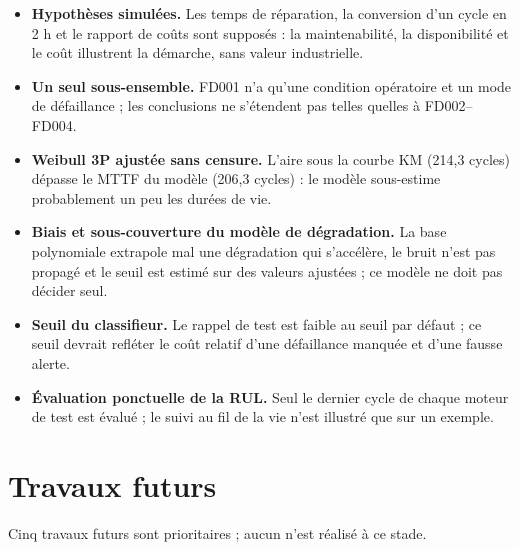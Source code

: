 \begin{itemize}
\item \textbf{Hypothèses simulées.} Les temps de réparation, la conversion d'un cycle en 2 h et le rapport de coûts sont supposés : la maintenabilité, la disponibilité et le coût illustrent la démarche, sans valeur industrielle.
\item \textbf{Un seul sous-ensemble.} FD001 n'a qu'une condition opératoire et un mode de défaillance ; les conclusions ne s'étendent pas telles quelles à FD002–FD004.
\item \textbf{Weibull 3P ajustée sans censure.} L'aire sous la courbe KM (214,3 cycles) dépasse le MTTF du modèle (206,3 cycles) : le modèle sous-estime probablement un peu les durées de vie.
\item \textbf{Biais et sous-couverture du modèle de dégradation.} La base polynomiale extrapole mal une dégradation qui s'accélère, le bruit n'est pas propagé et le seuil est estimé sur des valeurs ajustées ; ce modèle ne doit pas décider seul.
\item \textbf{Seuil du classifieur.} Le rappel de test est faible au seuil par défaut ; ce seuil devrait refléter le coût relatif d'une défaillance manquée et d'une fausse alerte.
\item \textbf{Évaluation ponctuelle de la RUL.} Seul le dernier cycle de chaque moteur de test est évalué ; le suivi au fil de la vie n'est illustré que sur un exemple.
\end{itemize}

\section{Travaux futurs}\label{sec:travaux-futurs}

Cinq travaux futurs sont prioritaires ; aucun n'est réalisé à ce stade.

